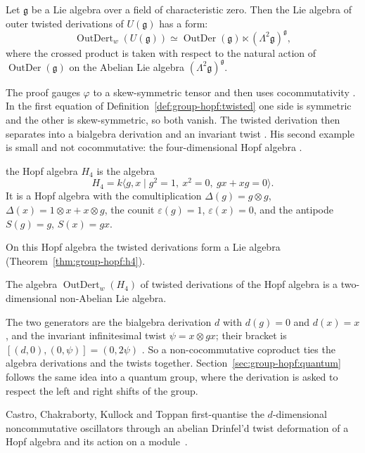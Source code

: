 \begin{theorem}\label{thm:group-hopf:davydov-ug}
Let $\mathfrak{g}$ be a Lie algebra over a field of characteristic zero. Then the Lie
algebra of outer twisted derivations of $U(\mathfrak{g})$ has a form:
\[
\operatorname{OutDert}_w(U(\mathfrak{g}))\simeq\operatorname{OutDer}(\mathfrak{g})
\ltimes(\Lambda^{2}\mathfrak{g})^{\mathfrak{g}},
\]
where the crossed product is taken with respect to the natural action of
$\operatorname{OutDer}(\mathfrak{g})$ on the Abelian Lie algebra
$(\Lambda^{2}\mathfrak{g})^{\mathfrak{g}}$.
\end{theorem}

The proof gauges $\varphi$ to a skew-symmetric tensor and then uses
cocommutativity \cite[pp.~577--578]{Davydov2013}. In the first equation of
Definition~\ref{def:group-hopf:twisted} one side is symmetric and the other is
skew-symmetric, so both vanish. The twisted derivation then separates into a
bialgebra derivation and an invariant twist \cite[pp.~577--578]{Davydov2013}.
His second example is small and not cocommutative: the four-dimensional
Hopf algebra \cite[p.~580]{Davydov2013}.

\begin{example}\label{ex:group-hopf:h4}
the Hopf algebra $H_4$ is the algebra
\[
H_4=k\langle g,x\mid g^{2}=1,\ x^{2}=0,\ gx+xg=0\rangle.
\]
It is a Hopf algebra with the comultiplication $\Delta(g)=g\otimes g$,
$\Delta(x)=1\otimes x+x\otimes g$, the counit $\varepsilon(g)=1$, $\varepsilon(x)=0$,
and the antipode $S(g)=g$, $S(x)=gx$.
\end{example}

On this Hopf algebra the twisted derivations form a Lie algebra (Theorem~\ref{thm:group-hopf:h4}).

\begin{theorem}\label{thm:group-hopf:h4}
The algebra $\operatorname{OutDert}_w(H_4)$ of twisted derivations of the Hopf
algebra is a two-dimensional non-Abelian Lie algebra.
\end{theorem}

The two generators are the bialgebra derivation $d$ with $d(g)=0$ and $d(x)=x$, and
the invariant infinitesimal twist $\psi=x\otimes gx$; their bracket is
$[(d,0),(0,\psi)]=(0,2\psi)$ \cite[p.~580]{Davydov2013}. So a
non-cocommutative coproduct ties the algebra derivations and the twists together.
Section~\ref{sec:group-hopf:quantum} follows the same idea into a quantum group,
where the derivation is asked to respect the left and right shifts of the group.

Castro, Chakraborty, Kullock and Toppan first-quantise the $d$-dimensional noncommutative oscillators through an abelian Drinfel'd twist deformation of a Hopf algebra and its action on a module~\cite{WlNoncommutativeOscillatorsFromA2011}.
